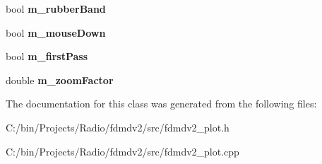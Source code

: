 \begin{DoxyCompactItemize}
\item 
\hypertarget{class_plot_panel_a7182715e509f98f42e78210d324fe042}{bool {\bfseries m\-\_\-rubber\-Band}}\label{class_plot_panel_a7182715e509f98f42e78210d324fe042}

\item 
\hypertarget{class_plot_panel_acebe9485868374626f03516e3508b592}{bool {\bfseries m\-\_\-mouse\-Down}}\label{class_plot_panel_acebe9485868374626f03516e3508b592}

\item 
\hypertarget{class_plot_panel_a1bb0714da68ee75a51a4ebb9e9ea3cad}{bool {\bfseries m\-\_\-first\-Pass}}\label{class_plot_panel_a1bb0714da68ee75a51a4ebb9e9ea3cad}

\item 
\hypertarget{class_plot_panel_ae2f4907a8e4ed958ef4995e99b1f7148}{double {\bfseries m\-\_\-zoom\-Factor}}\label{class_plot_panel_ae2f4907a8e4ed958ef4995e99b1f7148}

\end{DoxyCompactItemize}


The documentation for this class was generated from the following files\-:\begin{DoxyCompactItemize}
\item 
C\-:/bin/\-Projects/\-Radio/fdmdv2/src/fdmdv2\-\_\-plot.\-h\item 
C\-:/bin/\-Projects/\-Radio/fdmdv2/src/fdmdv2\-\_\-plot.\-cpp\end{DoxyCompactItemize}
